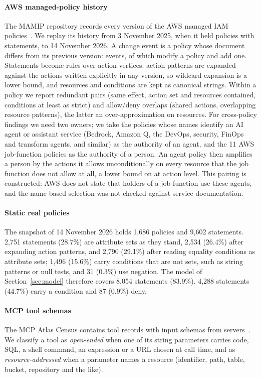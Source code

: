 \paragraph{AWS managed-policy history} The MAMIP repository records every version of the AWS managed IAM policies~\cite{mamip}. We replay its history from 3 November 2025, when it held \awsBasePol{} policies with \awsBaseSt{} statements, to 14 November 2026. A change event is a policy whose document differs from its previous version: \awsEvents{} events, of which \awsMod{} modify a policy and \awsAdd{} add one. Statements become rules over action vertices: action patterns are expanded against the \awsUniverse{} actions written explicitly in any version, so wildcard expansion is a lower bound, and resources and conditions are kept as canonical strings. Within a policy we report redundant pairs (same effect, action set and resources contained, conditions at least as strict) and allow/deny overlaps (shared actions, overlapping resource patterns), the latter an over-approximation on resources. For cross-policy findings we need two owners; we take the \awsAgentPol{} policies whose names identify an AI agent or assistant service (Bedrock, Amazon Q, the DevOps, security, FinOps and transform agents, and similar) as the authority of an agent, and the 11 AWS job-function policies as the authority of a person. An agent policy then amplifies a person by the actions it allows unconditionally on every resource that the job function does not allow at all, a lower bound on  at action level. This pairing is constructed: AWS does not state that holders of a job function use these agents, and the name-based selection was not checked against service documentation.

\paragraph{Static real policies} The snapshot of 14 November 2026 holds 1,686 policies and 9,602 statements. 2,751 statements (28.7\%) are attribute sets as they stand, 2,534 (26.4\%) after expanding action patterns, and 2,790 (29.1\%) after reading equality conditions as attribute sets; 1,496 (15.6\%) carry conditions that are not sets, such as string patterns or null tests, and 31 (0.3\%) use negation. The model of Section~\ref{sec:model} therefore covers 8,054 statements (83.9\%). 4,288 statements (44.7\%) carry a condition and 87 (0.9\%) deny.

\paragraph{MCP tool schemas} The MCP Atlas Census contains \csTools{} tool records with input schemas from \csServers{} servers~\cite{mcpatlas2026}. We classify a tool as \emph{open-ended} when one of its string parameters carries code, SQL, a shell command, an expression or a URL chosen at call time, and as \emph{resource-addressed} when a parameter names a resource (identifier, path, table, bucket, repository and the like).

